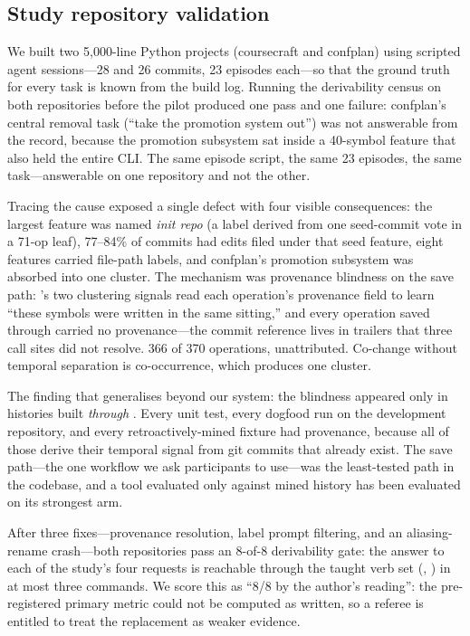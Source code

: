 \subsection{Study repository validation}
\label{sec:pilot-repos}

We built two 5{,}000-line Python projects (coursecraft and confplan) using
scripted agent sessions---28 and 26 commits, 23 episodes each---so that the
ground truth for every task is known from the build log. Running the
derivability census on both repositories before the pilot produced one pass and
one failure: confplan's central removal task (``take the promotion system out'')
was not answerable from the record, because the promotion subsystem sat inside
a 40-symbol feature that also held the entire CLI. The same episode script, the
same 23 episodes, the same task---answerable on one repository and not the other.

Tracing the cause exposed a single defect with four visible consequences: the
largest feature was named \emph{init repo} (a label derived from one seed-commit
vote in a 71-op leaf), 77--84\% of commits had edits filed under that seed
feature, eight features carried file-path labels, and confplan's promotion
subsystem was absorbed into one cluster. The mechanism was provenance blindness
on the save path: \sgt{}'s two clustering signals read each operation's
provenance field to learn ``these symbols were written in the same sitting,''
and every operation saved through  carried no provenance---the
commit reference lives in trailers that three call sites did not resolve. 366
of 370 operations, unattributed. Co-change without temporal separation is
co-occurrence, which produces one cluster.

The finding that generalises beyond our system: the blindness appeared only in
histories built \emph{through} \sgt{}. Every unit test, every dogfood run on
the development repository, and every retroactively-mined fixture had
provenance, because all of those derive their temporal signal from git commits
that already exist. The save path---the one workflow we ask participants to
use---was the least-tested path in the codebase, and a tool evaluated only
against mined history has been evaluated on its strongest arm.

After three fixes---provenance resolution, label prompt filtering, and an
aliasing-rename crash---both repositories pass an 8-of-8 derivability gate: the
answer to each of the study's four requests is reachable through the taught verb
set (, ) in at most three commands. We score this as ``8/8
by the author's reading'': the pre-registered primary metric could not be
computed as written, so a referee is entitled to treat the replacement as weaker
evidence.

